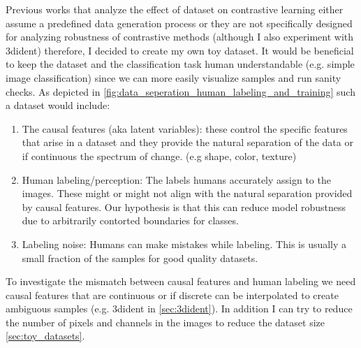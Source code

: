 \documentclass[../thesis.tex]{subfiles}
\begin{document}
Previous works that analyze the effect of dataset on contrastive learning either assume a predefined data generation process \cite{contrastive_inverts_data_gen} or they are not specifically designed for analyzing robustness of contrastive methods \cite{3dident} (although I also experiment with 3dident) therefore, I decided to create my own toy dataset. It would be beneficial to keep the dataset and the classification task human understandable (e.g. simple image classification) since we can more easily visualize samples and run sanity checks. As depicted in \ref{fig:data_seperation_human_labeling_and_training} such a dataset would include: 

\begin{enumerate}
	\item The causal features (aka latent variables): these control the specific features that arise
in a dataset and they provide the natural separation of the data or if continuous the
spectrum of change. (e.g shape, color, texture)
	
	\item Human labeling/perception: The labels humans accurately assign to the images. These might or might
not align with the natural separation provided by causal features. Our hypothesis is that this can reduce model robustness due to arbitrarily contorted boundaries for classes.
	
	\item Labeling noise: Humans can make mistakes while labeling. This is usually a small fraction of the samples for good quality datasets. 
	
\end{enumerate}
To investigate the mismatch between causal features and human labeling we need causal features that are continuous or if discrete can be interpolated to create ambiguous samples (e.g. 3dident in \ref{sec:3dident}). In addition I can try to reduce the number of pixels and channels in the images to reduce the dataset size \ref{sec:toy_datasets}. 

\end{document}
